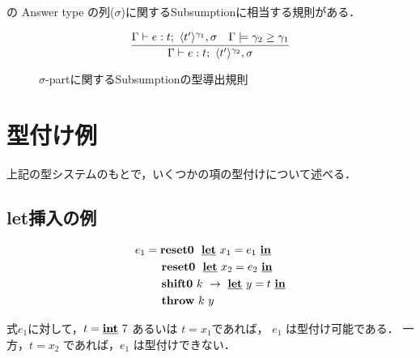 \Shiftz の Answer type の列($\sigma$)に関するSubsumptionに相当する規則がある．

\begin{figure}[H]
  \centering
  \[
    \infer
    {\Gamma \vdash e : t;~\codeT{t'}{\gamma_2},\sigma}
    {\Gamma \vdash e : t;~\codeT{t'}{\gamma_1},\sigma
      & \Gamma \models \gamma_2 \ord \gamma_1
    }
  \]
  \caption{$\sigma$-partに関するSubsumptionの型導出規則}
  \label{fig:sigma_subs_type_rule}
\end{figure}

\section{型付け例}

上記の型システムのもとで，いくつかの項の型付けについて述べる．

\subsection{let挿入の例}

\begin{align*}
  e_1 & = \textbf{reset0} ~~\underline{\textbf{let}}~x_1= e_1 ~\underline{\textbf{in}} \\
      & \phantom{=}~~ \textbf{reset0} ~~\underline{\textbf{let}}~x_2= e_2~\underline{\textbf{in}} \\
      & \phantom{=}~~ \textbf{shift0}~k~\to~\underline{\textbf{let}}~y=t~\underline{\textbf{in}} \\
      & \phantom{=}~~ \textbf{throw}~ k~ y
\end{align*}

式$e_1$に対して，$t=\underline{\textbf{int}}~ 7$ あるいは $t=x_1$であれば，
$e_1$ は型付け可能である．
一方，$t=x_2$ であれば，$e_1$ は型付けできない．

\newcommand\tzero{\codeT{t}{\gamma_0}}
\newcommand\tone{\codeT{t}{\gamma_1}}
\newcommand\ttwo{\codeT{t}{\gamma_2}}
\newcommand\tthree{\codeT{t}{\gamma_3}}
\newcommand\tonethree{\codeT{t}{\gamma_1\uni\gamma_3}}
\newcommand\tall{\codeT{t}{\gamma_2\uni\gamma_1\uni\gamma_3}}
\newcommand\Gammaone{
  \longer{\gamma_1}{\gamma_0},~x_1:\tone \vdash
  \cLet~x_2=e_2~\cIn~\cdots : \tone;~\tone,\tzero}
\newcommand\Gammatwo{
  \Gamma_1,~k_2:\contT{\ttwo}{\tone}{\tzero},
  ~k_1:\contT{\tone}{\tzero}{\cdot{}}}

\def\proofone{
  \infer
  {\vdash e_1:\tzero;~\cdot{}}
  {
    \infer{\vdash \cLet~x_1=e_1~\cIn~\Resetz~\cLet~x_2=e_2~\cIn~\cdots :
      \tzero;~\tzero
    }
    {\infer{\longer{\gamma_1}{\gamma_0},~x_1:\tone \vdash
        \Resetz~\cLet~x_2=e_2~\cIn~\cdots : \tone;~\tzero
      }
      {\prooftwo}
    }
  }
}
\def\prooftwo{
  \infer{\longer{\gamma_1}{\gamma_0},~x_1:\tone \vdash
    \cLet~x_2=e_2~\cIn~\cdots : \tone;~\tone,\tzero}
  {\infer{\Gamma_1=\longer{\gamma_2}{\gamma_1},~x_2:\ttwo,~\longer{\gamma_1}{\gamma_0},~x_1:\tone \vdash
      \shiftz{k}{\cdots} : \ttwo;~\tone,\tzero
    }
    {\proofthree}
  }
}

